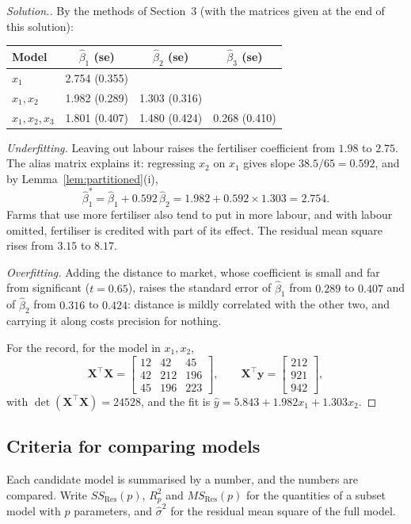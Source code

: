 \documentclass[11pt,a4paper]{article}
\numberwithin{equation}{section}
\theoremstyle{definition}
\newenvironment{solution}
  {\renewcommand{\qedsymbol}{}\begin{proof}[\textit{Solution}.]}
  {\end{proof}}
\begin{document}
\begin{solution}
By the methods of Section~3 (with the matrices given at the end of this solution):
\begin{center}
\begin{tabular}{l|ccc}
Model & $\hat\beta_1$ (se) & $\hat\beta_2$ (se) & $\hat\beta_3$ (se) \\
\hline
$x_1$ & 2.754 (0.355) & & \\
$x_1, x_2$ & 1.982 (0.289) & 1.303 (0.316) & \\
$x_1, x_2, x_3$ & 1.801 (0.407) & 1.480 (0.424) & 0.268 (0.410) \\
\end{tabular}
\end{center}
\emph{Underfitting.} Leaving out labour raises the fertiliser coefficient from $1.98$ to $2.75$. The
alias matrix explains it: regressing $x_2$ on $x_1$ gives slope $38.5/65 = 0.592$, and by
Lemma~\ref{lem:partitioned}(i),
\[
\hat\beta_1^* = \hat\beta_1 + 0.592\,\hat\beta_2 = 1.982 + 0.592 \times 1.303 = 2.754 .
\]
Farms that use more fertiliser also tend to put in more labour, and with labour omitted, fertiliser
is credited with part of its effect. The residual mean square rises from $3.15$ to $8.17$.

\emph{Overfitting.} Adding the distance to market, whose coefficient is small and far from
significant ($t = 0.65$), raises the standard error of $\hat\beta_1$ from $0.289$ to $0.407$ and of
$\hat\beta_2$ from $0.316$ to $0.424$: distance is mildly correlated with the other two, and carrying
it along costs precision for nothing.

For the record, for the model in $x_1, x_2$,
\[
\mathbf{X}^\top\mathbf{X} = \begin{bmatrix} 12 & 42 & 45 \\ 42 & 212 & 196 \\ 45 & 196 & 223 \end{bmatrix} ,
\qquad
\mathbf{X}^\top\mathbf{y} = \begin{bmatrix} 212 \\ 921 \\ 942 \end{bmatrix} ,
\]
with $\det(\mathbf{X}^\top\mathbf{X}) = 24528$, and the fit is $\hat y = 5.843 + 1.982x_1 + 1.303x_2$.
\end{solution}

\subsection{Criteria for comparing models}
Each candidate model is summarised by a number, and the numbers are compared. Write
$SS_{\mathrm{Res}}(p)$, $R^2_p$ and $MS_{\mathrm{Res}}(p)$ for the quantities of a subset model with
$p$ parameters, and $\hat\sigma^2$ for the residual mean square of the full model.
\end{document}
